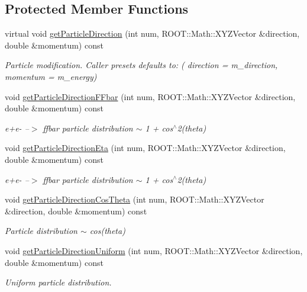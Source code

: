 \subsection*{Protected Member Functions}
\begin{DoxyCompactItemize}
\item 
virtual void \hyperlink{class_d_d4hep_1_1_simulation_1_1_geant4_isotrope_generator_a6073247e3b5c587af44fcfb92fac6849}{get\+Particle\+Direction} (int num, R\+O\+O\+T\+::\+Math\+::\+X\+Y\+Z\+Vector \&direction, double \&momentum) const
\begin{DoxyCompactList}\small\item\em Particle modification. Caller presets defaults to\+: ( direction = m\+\_\+direction, momentum = m\+\_\+energy) \end{DoxyCompactList}\item 
void \hyperlink{class_d_d4hep_1_1_simulation_1_1_geant4_isotrope_generator_a326bedf16953d724e6865a160a1b1b37}{get\+Particle\+Direction\+F\+Fbar} (int num, R\+O\+O\+T\+::\+Math\+::\+X\+Y\+Z\+Vector \&direction, double \&momentum) const
\begin{DoxyCompactList}\small\item\em e+e-\/ --$>$ ffbar particle distribution $\sim$ 1 + cos$^\wedge$2(theta) \end{DoxyCompactList}\item 
void \hyperlink{class_d_d4hep_1_1_simulation_1_1_geant4_isotrope_generator_a0b5062aadd8a736fe9d287aeda411a3c}{get\+Particle\+Direction\+Eta} (int num, R\+O\+O\+T\+::\+Math\+::\+X\+Y\+Z\+Vector \&direction, double \&momentum) const
\begin{DoxyCompactList}\small\item\em e+e-\/ --$>$ ffbar particle distribution $\sim$ 1 + cos$^\wedge$2(theta) \end{DoxyCompactList}\item 
void \hyperlink{class_d_d4hep_1_1_simulation_1_1_geant4_isotrope_generator_acca659200388e8bf4e5acf7a24fcb332}{get\+Particle\+Direction\+Cos\+Theta} (int num, R\+O\+O\+T\+::\+Math\+::\+X\+Y\+Z\+Vector \&direction, double \&momentum) const
\begin{DoxyCompactList}\small\item\em Particle distribution $\sim$ cos(theta) \end{DoxyCompactList}\item 
void \hyperlink{class_d_d4hep_1_1_simulation_1_1_geant4_isotrope_generator_a5f831997739d697b9d99920b74dcd1be}{get\+Particle\+Direction\+Uniform} (int num, R\+O\+O\+T\+::\+Math\+::\+X\+Y\+Z\+Vector \&direction, double \&momentum) const
\begin{DoxyCompactList}\small\item\em Uniform particle distribution. \end{DoxyCompactList}\end{DoxyCompactItemize}
